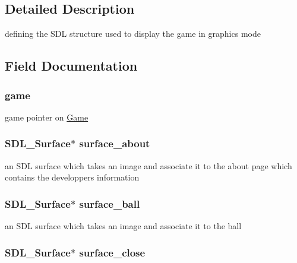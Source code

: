 \subsection{Detailed Description}
defining the S\-D\-L structure used to display the game in graphics mode 

\subsection{Field Documentation}
\hypertarget{structsdl_game_ac6a5ed6191fcf3a5bf0445921feb4f48}{
\subsubsection[{game}]{ game}}\label{structsdl_game_ac6a5ed6191fcf3a5bf0445921feb4f48}
game pointer on \hyperlink{struct_game}{Game} \hypertarget{structsdl_game_a3694e2c887e48ac072e001a1e6d7afed}{
\subsubsection[{surface\-\_\-about}]{\setlength{\rightskip}{0pt plus 5cm}S\-D\-L\-\_\-\-Surface$\ast$ surface\-\_\-about}}\label{structsdl_game_a3694e2c887e48ac072e001a1e6d7afed}
an S\-D\-L surface which takes an image and associate it to the about page which contains the developpers information \hypertarget{structsdl_game_aecad219d2fd8802f95ef5b19542880c9}{
\subsubsection[{surface\-\_\-ball}]{\setlength{\rightskip}{0pt plus 5cm}S\-D\-L\-\_\-\-Surface$\ast$ surface\-\_\-ball}}\label{structsdl_game_aecad219d2fd8802f95ef5b19542880c9}
an S\-D\-L surface which takes an image and associate it to the ball \hypertarget{structsdl_game_ae44e97da75374b6f41f14486332e7dba}{
\subsubsection[{surface\-\_\-close}]{\setlength{\rightskip}{0pt plus 5cm}S\-D\-L\-\_\-\-Surface$\ast$ surface\-\_\-close}}\label{structsdl_game_ae44e97da75374b6f41f14486332e7dba}
